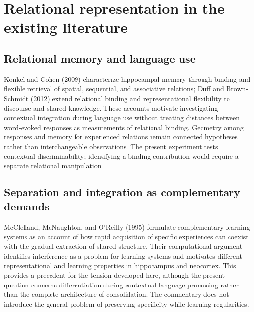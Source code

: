 \documentclass[11pt]{article}
\begin{document}
\hypertarget{relational-representation-in-the-existing-literature}{%
\section{Relational representation in the existing
literature}\label{relational-representation-in-the-existing-literature}}

\hypertarget{relational-memory-and-language-use}{%
\subsection{Relational memory and language
use}\label{relational-memory-and-language-use}}

Konkel and Cohen (2009) characterize hippocampal memory through binding
and flexible retrieval of spatial, sequential, and associative
relations; Duff and Brown-Schmidt (2012) extend relational binding and
representational flexibility to discourse and shared knowledge. These
accounts motivate investigating contextual integration during language
use without treating distances between word-evoked responses as
measurements of relational binding. Geometry among responses and memory
for experienced relations remain connected hypotheses rather than
interchangeable observations. The present experiment tests contextual
discriminability; identifying a binding contribution would require a
separate relational manipulation.

\hypertarget{separation-and-integration-as-complementary-demands}{%
\subsection{Separation and integration as complementary
demands}\label{separation-and-integration-as-complementary-demands}}

McClelland, McNaughton, and O'Reilly (1995) formulate complementary
learning systems as an account of how rapid acquisition of specific
experiences can coexist with the gradual extraction of shared structure.
Their computational argument identifies interference as a problem for
learning systems and motivates different representational and learning
properties in hippocampus and neocortex. This provides a precedent for
the tension developed here, although the present question concerns
differentiation during contextual language processing rather than the
complete architecture of consolidation. The commentary does not
introduce the general problem of preserving specificity while learning
regularities.
\end{document}
